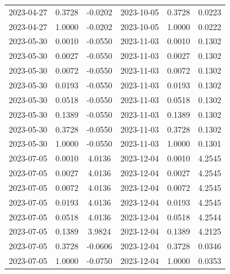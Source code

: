 \begin{footnotesize}
\begin{longtable}{lcc|lcc}
2023-04-27 & 0.3728 & -0.0202 & 2023-10-05 & 0.3728 & 0.0223 \\
2023-04-27 & 1.0000 & -0.0202 & 2023-10-05 & 1.0000 & 0.0222 \\
2023-05-30 & 0.0010 & -0.0550 & 2023-11-03 & 0.0010 & 0.1302 \\
2023-05-30 & 0.0027 & -0.0550 & 2023-11-03 & 0.0027 & 0.1302 \\
2023-05-30 & 0.0072 & -0.0550 & 2023-11-03 & 0.0072 & 0.1302 \\
2023-05-30 & 0.0193 & -0.0550 & 2023-11-03 & 0.0193 & 0.1302 \\
2023-05-30 & 0.0518 & -0.0550 & 2023-11-03 & 0.0518 & 0.1302 \\
2023-05-30 & 0.1389 & -0.0550 & 2023-11-03 & 0.1389 & 0.1302 \\
2023-05-30 & 0.3728 & -0.0550 & 2023-11-03 & 0.3728 & 0.1302 \\
2023-05-30 & 1.0000 & -0.0550 & 2023-11-03 & 1.0000 & 0.1301 \\
2023-07-05 & 0.0010 & 4.0136 & 2023-12-04 & 0.0010 & 4.2545 \\
2023-07-05 & 0.0027 & 4.0136 & 2023-12-04 & 0.0027 & 4.2545 \\
2023-07-05 & 0.0072 & 4.0136 & 2023-12-04 & 0.0072 & 4.2545 \\
2023-07-05 & 0.0193 & 4.0136 & 2023-12-04 & 0.0193 & 4.2545 \\
2023-07-05 & 0.0518 & 4.0136 & 2023-12-04 & 0.0518 & 4.2544 \\
2023-07-05 & 0.1389 & 3.9824 & 2023-12-04 & 0.1389 & 4.2125 \\
2023-07-05 & 0.3728 & -0.0606 & 2023-12-04 & 0.3728 & 0.0346 \\
2023-07-05 & 1.0000 & -0.0750 & 2023-12-04 & 1.0000 & 0.0353 \\
\end{longtable}
\end{footnotesize}
